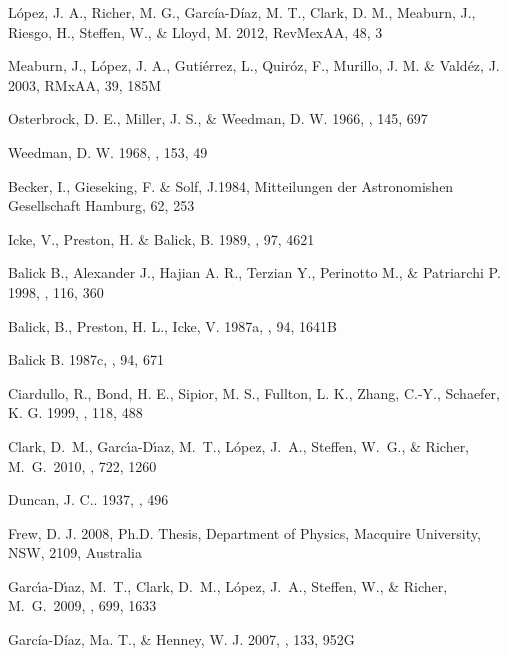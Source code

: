 \documentclass[useAMS, usenatbib]{mnras}
\begin{document}
%
\begin{thebibliography}{}


 L\'opez, J. A., Richer, M. G.,
  Garc\'ia-D\'iaz, M. T., Clark, D. M., Meaburn, J., Riesgo, H., Steffen,
  W., \& Lloyd, M. 2012, RevMexAA, 48, 3

 Meaburn, J., L\'opez,
J. A., Guti\'errez, L., Quir\'oz, F., Murillo, J. M. \& Vald\'ez, J.
2003, RMxAA, 39, 185M

 Osterbrock, D. E., Miller,
  J. S., \& Weedman, D. W. 1966, \apj, 145, 697

 Weedman, D. W. 1968, \apj, 153, 49

 Becker, I., Gieseking, F. \& Solf, J.1984, 
Mitteilungen der Astronomishen Gesellschaft Hamburg, 62, 253

 Icke, V., Preston, H. \& Balick, B.
 1989, \aj, 97, 4621



 Balick B., Alexander J.,
  Hajian A. R., Terzian Y., Perinotto M., \& Patriarchi P. 1998,
  \apj, 116, 360

 Balick, B., Preston, H. L.,
  Icke, V. 1987a, \aj, 94, 1641B



 Balick B. 1987c, \aj, 94, 671

 Ciardullo, R., Bond,
  H. E., Sipior, M. S., Fullton, L. K., Zhang, C.-Y., Schaefer,
  K. G. 1999, \aj, 118, 488
  
  Clark, D.~M., 
Garc{\'{\i}}a-D{\'{\i}}az, M.~T., L{\'o}pez, J.~A., Steffen, W.~G., 
\& Richer, M.~G.\ 2010, \apj, 722, 1260 

 Duncan, J. C.. 1937, , 496
  
 Frew, D. J. 2008, Ph.D. Thesis, Department of Physics,
  Macquire University, NSW, 2109, Australia
  
Garc{\'{\i}}a-D{\'{\i}}az, M.~T., Clark, D.~M., L{\'o}pez, J.~A., Steffen, 
W., \& Richer, M.~G.\ 2009, \apj, 699, 1633 

 Garc\'ia-D\'iaz,
  Ma. T., \& Henney, W. J. 2007, \aj, 133, 952G


\end{thebibliography}
\end{document}

